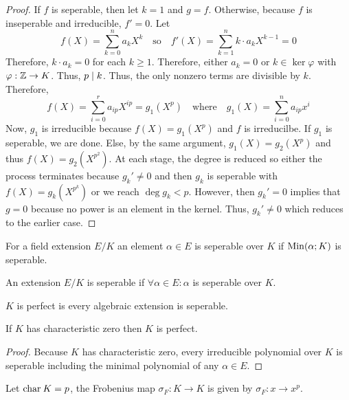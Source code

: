 \documentclass[12pt]{extarticle}
\begin{document}
\begin{proof}
If $f$ is seperable, then let $k = 1$ and $g = f$. Otherwise, because $f$ is inseperable and irreducible, $f' = 0$. Let \[f(X) = \sum\limits_{k = 0}^n a_k X^k \quad \text{so} \quad f'(X) = \sum\limits_{k = 1}^n k \cdot a_k X^{k - 1} = 0\]
Therefore, $k \cdot a_k = 0$ for each $k \ge 1$. Therefore, either $a_k = 0$ or $k \in \ker{\varphi}$ with $\varphi : \mathbb{Z} \to K$. Thus, $p \mid k$. Thus, the only nonzero terms are divisible by $k$. Therefore,
\[f(X) = \sum\limits_{i = 0}^r a_{ip} X^{ip} = g_1(X^p) \quad \text{where} \quad g_1(X) = \sum\limits_{i = 0}^n a_{ip} x^i\]
Now, $g_1$ is irreducible because $f(X) = g_1(X^p)$ and $f$ is irreducilbe. If $g_1$ is seperable, we are done. Else, by the same argument, $g_1(X) = g_2(X^p)$ and thus $f(X) = g_2(X^{p^2})$. At each stage, the degree is reduced so either the process terminates because $g_k' \neq 0$ and then $g_k$ is seperable with $f(X) = g_k(X^{p^k})$ or we reach $\deg{g_k} < p$. However, then $g_k' = 0$ implies that $g = 0$ because no power is an element in the kernel. Thus, $g_k' \neq 0$ which reduces to the earlier case.  
\end{proof}

\begin{definition}
For a field extension $E/K$ an element $\alpha \in E$ is seperable over $K$ if $\mathrm{Min}(\alpha;K)$ is seperable. 
\end{definition}

\begin{definition}
An extension $E/K$ is seperable if $\forall \alpha \in E : \alpha$ is seperable over $K$.
\end{definition}

\begin{definition}
$K$ is perfect is every algebraic extension is seperable.
\end{definition}

\begin{proposition}
If $K$ has characteristic zero then $K$ is perfect.
\end{proposition}

\begin{proof}
Because $K$ has characteristic zero, every irreducible polynomial over $K$ is seperable including the minimal polynomial of any $\alpha \in E$.  
\end{proof}

\begin{definition}
Let $\mathrm{char} \: K = p$, the Frobenius map $\sigma_F : K \to K$ is given by $\sigma_F : x \to x^p$.
\end{definition}
\end{document}
